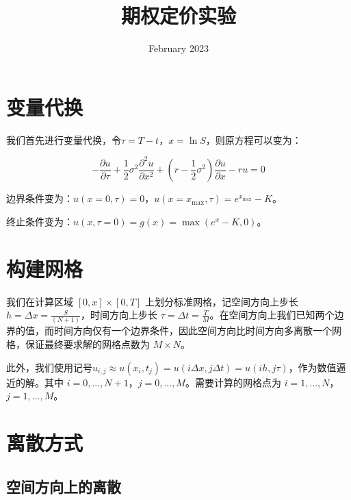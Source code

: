 \documentclass{article}
\title{期权定价实验}
\author{}
\date{February 2023}
\begin{document}
\maketitle


\vspace{2ex}

\section{变量代换}

我们首先进行变量代换，令$\tau = T-t$，$x = \ln S$，则原方程可以变为：

$$-\frac{\partial u}{\partial \tau} + \frac{1}{2}\sigma^2\frac{\partial^2 u}{\partial x^2} + (r-\frac{1}{2}\sigma^2)\frac{\partial u}{\partial x} - r u = 0$$

边界条件变为：$u(x=0, \tau) = 0$，$u(x=x_{\max}, \tau) = e^{x_{\max}}-K$。

终止条件变为：$u(x,\tau=0) = g(x) = \max(e^x-K,0)$。


\section{构建网格}
我们在计算区域 $[0, x] × [0, T]$ 上划分标准网格，记空间方向上步长 $h = \Delta x = \frac{S}{(N + 1)}$，时间方向上步长 $\tau = \Delta t = \frac{T}{M}$。在空间方向上我们已知两个边界的值，而时间方向仅有一个边界条件，因此空间方向比时间方向多离散一个网格，保证最终要求解的网格点数为 $M × N$。

此外，我们使用记号$u_{i,j} \approx u(x_i, t_j) = u(i\Delta x, j\Delta t) = u(ih, j\tau)$，作为数值逼近的解。其中 $i = 0,..., N + 1$，$j = 0,..., M$。需要计算的网格点为 $i = 1,..., N$，$j = 1,..., M$。





\section{离散方式}


\subsection{空间方向上的离散}
\end{document}
